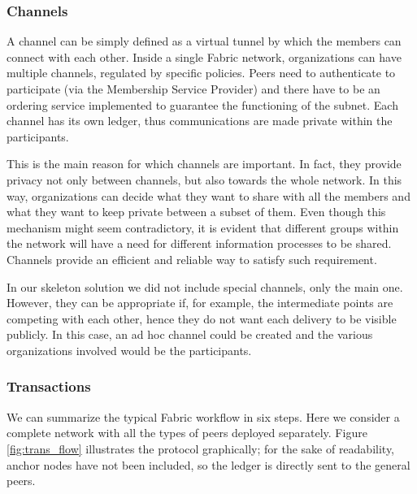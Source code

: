 \subsubsection{Channels}
A channel can be simply defined as a virtual tunnel by which the members can connect with each other. Inside a single Fabric network, organizations can have multiple channels, regulated by specific policies. Peers need to authenticate to participate (via the Membership Service Provider) and there have to be an ordering service implemented to guarantee the functioning of the subnet. Each channel has its own ledger, thus communications are made private within the participants.

This is the main reason for which channels are important. In fact, they provide privacy not only between channels, but also towards the whole network. In this way, organizations can decide what they want to share with all the members and what they want to keep private between a subset of them.
Even though this mechanism might seem contradictory, it is evident that different groups within the network will have a need for different information processes to be shared. Channels provide an efficient and reliable way to satisfy such requirement.

In our skeleton solution we did not include special channels, only the main one. However, they can be appropriate if, for example, the intermediate points are competing with each other, hence they do not want each delivery to be visible publicly. In this case, an ad hoc channel could be created and the various organizations involved would be the participants.

\subsubsection{Transactions}
We can summarize the typical Fabric workflow in six steps. Here we consider a complete network with all the types of peers deployed separately. Figure \ref{fig:trans_flow} illustrates the protocol graphically; for the sake of readability, anchor nodes have not been included, so the ledger is directly sent to the general peers.

\begin{figure}[htb]
\end{figure}

